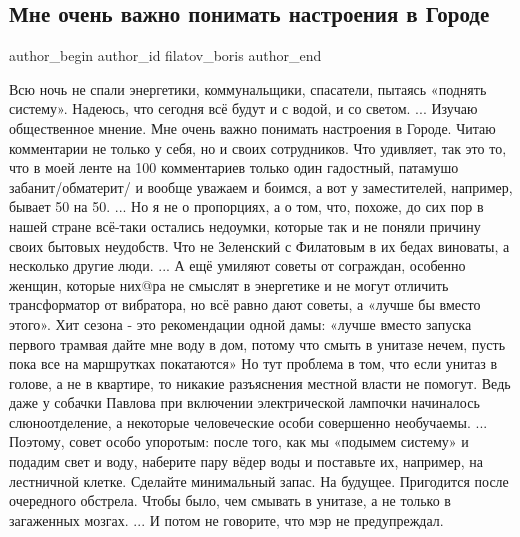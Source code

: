  
 
 
 
 
 
\subsection{Мне очень важно понимать настроения в Городе}
\label{sec:24_11_2022.fb.filatov_boris.2.nastroenia_v_gorode}
 
\ifcmt
 author_begin
   author_id filatov_boris
 author_end
\fi

\obeycr
Всю ночь не спали энергетики, коммунальщики, спасатели, пытаясь «поднять систему».
Надеюсь, что сегодня всё будут и с водой, и со светом.
...
Изучаю общественное мнение. 
Мне очень важно понимать настроения в Городе.
Читаю комментарии не только у себя, но и своих сотрудников.
Что удивляет, так это то, что в моей ленте на 100 комментариев только один гадостный, патамушо забанит/обматерит/ и вообще уважаем и боимся, а вот у заместителей, например, бывает 50 на 50.
...
Но я не о пропорциях, а о том, что, похоже, до сих пор в нашей стране всё-таки остались недоумки, которые так и не поняли причину своих бытовых неудобств.
Что не Зеленский с Филатовым в их бедах виноваты, а несколько другие люди.
...
А ещё умиляют советы от сограждан, особенно женщин, которые них@ра не смыслят в энергетике и не могут отличить трансформатор от вибратора, но всё равно дают советы, а «лучше бы вместо этого».
Хит сезона - это рекомендации одной дамы: «лучше вместо запуска первого трамвая дайте мне воду в дом, потому что смыть в унитазе нечем, пусть пока все на маршрутках покатаются»
Но тут проблема в том, что если унитаз в голове, а не в квартире, то никакие разъяснения местной власти не помогут.
Ведь даже у собачки Павлова при включении электрической лампочки начиналось слюноотделение, а некоторые человеческие особи совершенно необучаемы.
...
Поэтому, совет особо упоротым: после того, как мы «подымем систему» и подадим свет и воду, наберите пару вёдер воды и поставьте их, например, на лестничной клетке.
Сделайте минимальный запас.
На будущее.
Пригодится после очередного обстрела.
Чтобы было, чем смывать в унитазе, а не только в загаженных мозгах.
...
И потом не говорите, что мэр не предупреждал.
\restorecr

